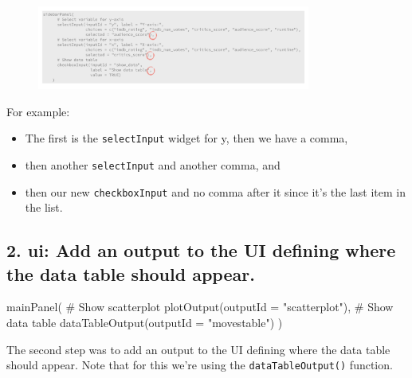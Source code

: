\documentclass[
  letterpaper,
  DIV=11,
  numbers=noendperiod]{scrreprt}
\newenvironment{Shaded}{\begin{snugshade}}{\end{snugshade}}
\newcommand{\AttributeTok}[1]{\textcolor[rgb]{0.40,0.46,0.14}{#1}}
\newcommand{\CommentTok}[1]{\textcolor[rgb]{0.37,0.37,0.37}{#1}}
\newcommand{\FunctionTok}[1]{\textcolor[rgb]{0.28,0.35,0.67}{#1}}
\newcommand{\NormalTok}[1]{\textcolor[rgb]{0.00,0.46,0.62}{#1}}
\newcommand{\StringTok}[1]{\textcolor[rgb]{0.13,0.47,0.30}{#1}}
\providecommand{\tightlist}{%
  \setlength{\itemsep}{0pt}\setlength{\parskip}{0pt}}
\begin{document}
\begin{figure}

{\centering \includegraphics[width=0.8\textwidth,height=\textheight]{./images/commas.png}

}

\end{figure}

For example:

\begin{itemize}
\tightlist
\item
  The first is the \texttt{selectInput} widget for y, then we have a
  comma,
\item
  then another \texttt{selectInput} and another comma, and
\item
  then our new \texttt{checkboxInput} and no comma after it since it's
  the last item in the list.
\end{itemize}

\hypertarget{ui-add-an-output-to-the-ui-defining-where-the-data-table-should-appear.}{%
\subsection{\texorpdfstring{2. \textbf{ui}: Add an output to the UI
defining where the data table should
appear.}{2. ui: Add an output to the UI defining where the data table should appear.}}\label{ui-add-an-output-to-the-ui-defining-where-the-data-table-should-appear.}}

\begin{Shaded}
\begin{Highlighting}[]
\FunctionTok{mainPanel}\NormalTok{(}
  \CommentTok{\# Show scatterplot}
  \FunctionTok{plotOutput}\NormalTok{(}\AttributeTok{outputId =} \StringTok{"scatterplot"}\NormalTok{), }
  \CommentTok{\# Show data table}
  \FunctionTok{dataTableOutput}\NormalTok{(}\AttributeTok{outputId =} \StringTok{"movestable"}\NormalTok{)}
\NormalTok{)}
\end{Highlighting}
\end{Shaded}

The second step was to add an output to the UI defining where the data
table should appear. Note that for this we're using the
\texttt{dataTableOutput()} function.
\end{document}

